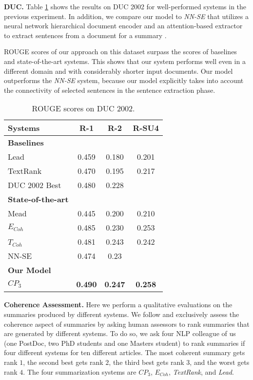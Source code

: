 \textbf{DUC. }
Table \ref{table:duc2002_res} shows the results on DUC 2002 for well-performed  systems in the previous experiment. 
In addition, we compare our model to \emph{NN-SE} that utilizes a neural network hierarchical document encoder and an \mbox{attention-based} extractor to extract sentences from a document for a summary \cite{chengjianpeng16}.

ROUGE scores of our approach on this dataset surpass the scores of baselines and state-of-the-art systems. 
This shows that our system performs well even in a different domain and with considerably shorter input documents. 
Our model outperforms the \emph{NN-SE} system, because our model explicitly takes into account the connectivity of selected sentences in the sentence extraction phase. 



\begin{table}[!ht]
\centering
\small
\begin{tabular}{@{}l|c|c|c@{}}
\hline
Systems & R-1 & R-2 & R-SU4\\\hline
\textbf{Baselines}  & & &\\
Lead & 0.459 & 0.180 & 0.201\\
TextRank & 0.470 & 0.195 & 0.217\\
DUC 2002 Best & 0.480 & 0.228 & \\\hline
\textbf{State-of-the-art}  & & &\\
Mead & 0.445 & 0.200 & 0.210\\
$E_{Coh}$ & 0.485 & 0.230 & 0.253 \\
$T_{Coh}$\ & 0.481 & 0.243 & 0.242 \\
NN-SE & 0.474 & 0.23 & \\\hline
\textbf{Our Model} & & & \\
$CP_3$ & \textbf{0.490} & \textbf{0.247} & \textbf{0.258}\\
\hline
\end{tabular}
\caption{ROUGE scores on DUC 2002.}
\label{table:duc2002_res}
\end{table}



\textbf{Coherence Assessment. } 
Here we perform a qualitative evaluations on the summaries produced by different systems. 
We follow  and exclusively assess the coherence aspect of summaries by asking human assessors to rank summaries that are generated by different systems. 
To do so, we ask four NLP colleague of us (one PostDoc, two PhD students and one Masters student) to rank summaries if four different systems for ten different articles. 
The most coherent summary gets rank $1$, the second best gets rank $2$, the third best gets rank $3$, and the worst gets rank $4$.
The four summarization systems are
\emph{$CP_3$}, \emph{$E_{Coh}$}, \emph{Text\-Rank}, and \emph{Lead}.

